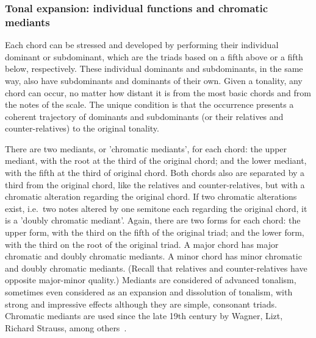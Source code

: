 \subsubsection{Tonal expansion: individual functions and chromatic mediants}
Each chord can be stressed and developed by performing their individual dominant or subdominant, which are the triads based
on a fifth above or a fifth below, respectively. These individual dominants and subdominants,
in the same way, also have subdominants and dominants of their own. Given a tonality, any chord can occur, no matter
how distant it is from the most basic chords and from the notes of the scale. The unique condition is that the occurrence presents a coherent trajectory of dominants and subdominants (or their relatives and counter-relatives) to the original tonality.

There are two mediants, or 'chromatic mediants', for each chord: the upper
mediant, with the root at the third of the original chord;
and the lower mediant, with the fifth at the third of original chord.
Both chords also are separated by a third from the original chord, like the relatives and counter-relatives,
but with a chromatic alteration regarding the original chord.
If two chromatic alterations exist, i.e.\ two notes altered by one semitone each regarding the original chord,
it is a 'doubly chromatic mediant'.
Again, there are two forms for each chord: the upper form, with the third on the fifth of the original triad;
and the lower form, with the third on the root
of the original triad.
A major chord has major chromatic and doubly chromatic mediants.
A minor chord has minor chromatic and doubly chromatic mediants.
(Recall that relatives and counter-relatives have opposite major-minor quality.)
Mediants are considered of advanced tonalism,
sometimes even considered as an expansion and dissolution of tonalism,
with strong and impressive effects although they are simple, consonant triads.
Chromatic mediants are used since the late 19th century by Wagner, Lizt, Richard Strauss, among others~\cite{Harmonia,Salzer}. 

